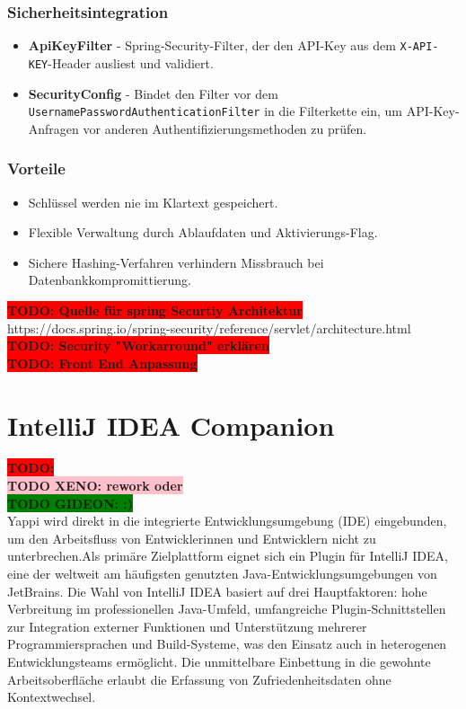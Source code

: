 \documentclass[12pt,a4paper]{report}
\newcommand{\todo}[1]{\colorbox{red}{\textbf{TODO: #1}}\\}
\newcommand{\xeno}[1]{\colorbox{pink}{\textbf{TODO XENO: #1}}\\}
\newcommand{\gideon}[1]{\colorbox{green}{\textbf{TODO GIDEON: #1}}\\}
\begin{document}
    \subsubsection{Sicherheitsintegration}
    \begin{itemize}
      \item \textbf{ApiKeyFilter} - Spring-Security-Filter, der den API-Key aus dem \texttt{X-API-KEY}-Header ausliest und validiert.
      \item \textbf{SecurityConfig} - Bindet den Filter vor dem \texttt{UsernamePasswordAuthenticationFilter} in die Filterkette ein, um API-Key-Anfragen vor anderen Authentifizierungsmethoden zu prüfen.
    \end{itemize}

    \subsubsection{Vorteile}
    \begin{itemize}
      \item Schlüssel werden nie im Klartext gespeichert.
      \item Flexible Verwaltung durch Ablaufdaten und Aktivierungs-Flag.
      \item Sichere Hashing-Verfahren verhindern Missbrauch bei Datenbankkompromittierung.
    \end{itemize}


    \todo{Quelle für spring Securtiy Architektur}
    https://docs.spring.io/spring-security/reference/servlet/architecture.html \\
    \todo{Security "Workarround" erklären}
    \todo{Front End Anpassung}


\section{IntelliJ IDEA Companion}

\todo{}

\xeno{rework oder}
\gideon{:)}

Yappi wird direkt in die integrierte Entwicklungsumgebung (IDE) eingebunden, um den Arbeitsfluss von Entwicklerinnen
und Entwicklern nicht zu unterbrechen.Als primäre Zielplattform eignet sich ein Plugin für IntelliJ IDEA,
eine der weltweit am häufigsten genutzten Java-Entwicklungsumgebungen von JetBrains.
Die Wahl von IntelliJ IDEA basiert auf drei Hauptfaktoren: hohe Verbreitung im professionellen Java-Umfeld,
umfangreiche Plugin-Schnittstellen zur Integration externer Funktionen und Unterstützung mehrerer Programmiersprachen
und Build-Systeme, was den Einsatz auch in heterogenen Entwicklungsteams ermöglicht.
Die unmittelbare Einbettung in die gewohnte Arbeitsoberfläche erlaubt die Erfassung von Zufriedenheitsdaten ohne Kontextwechsel.
\end{document}
